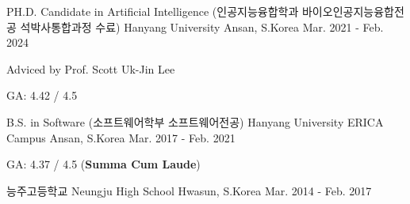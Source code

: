

\begin{cventries}

  \cventry
    {PH.D. Candidate in Artificial Intelligence (인공지능융합학과 바이오인공지능융합전공 석박사통합과정 수료)} %
    {Hanyang University} %
    {Ansan, S.Korea} %
    {Mar. 2021 - Feb. 2024} %
    {
      \begin{cvitems} %
        \item {Adviced by Prof. Scott Uk-Jin Lee}
        \item {GA: 4.42 / 4.5}
      \end{cvitems}
    }

    \cventry
    {B.S. in Software (소프트웨어학부 소프트웨어전공)} %
    {Hanyang University ERICA Campus} %
    {Ansan, S.Korea} %
    {Mar. 2017 - Feb. 2021} %
    {
      \begin{cvitems} %
        \item {GA: 4.37 / 4.5 (\textbf{Summa Cum Laude})} 
      \end{cvitems}
    }

    \cventry
    {능주고등학교} %
    {Neungju High School} %
    {Hwasun, S.Korea} %
    {Mar. 2014 - Feb. 2017} %
    {}
\end{cventries}

